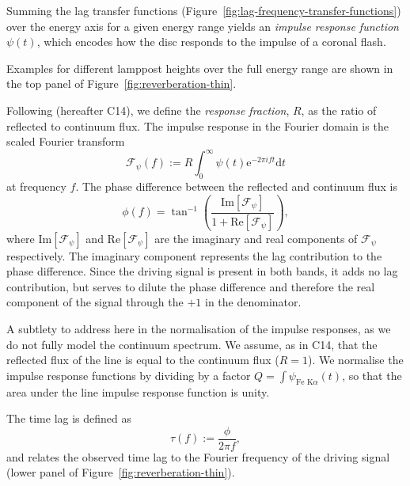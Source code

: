 \documentclass[fleqn,usenatbib]{mnras}
\newcommand{\e}{\text{e}}
\renewcommand{\d}{\text{d}}
\renewcommand{\Im}[1]{\text{Im}\left[#1\right]}
\renewcommand{\Re}[1]{\text{Re}\left[#1\right]}
\begin{document}
Summing the lag transfer functions
(Figure~\ref{fig:lag-frequency-transfer-functions}) over the energy axis for a
given energy range yields an \textit{impulse response function} $\psi(t)$, which
encodes how the disc responds to the impulse of a coronal flash.

Examples for different lamppost heights over the full energy range are shown in
the top panel of Figure~\ref{fig:reverberation-thin}.

Following \citet{cackett_modelling_2014} (hereafter C14), we define the
\textit{response fraction}, $R$, as the ratio of reflected to continuum flux.
The impulse response in the Fourier domain is the scaled Fourier transform
\begin{equation}
    \mathscr{F}_\psi(f) := R \int_{0}^\infty \psi(t) \e^{-2\pi i f t} \d t
\end{equation}
at frequency $f$.
The phase difference between the reflected and continuum flux is
\begin{equation}
    \phi(f) = \tan^{-1} \left(
        \frac{\Im{\mathscr{F}_\psi}}{1 + \Re{\mathscr{F}_\psi}}
    \right),
\end{equation}
where $\Im{\mathscr{F}_\psi}$ and $\Re{\mathscr{F}_\psi}$ are the imaginary and
real components of $\mathscr{F}_\psi$ respectively. The imaginary component
represents the lag contribution to the phase difference. Since the driving
signal is present in both bands, it adds no lag contribution, but serves to
dilute the phase difference and therefore the real component of the signal
through the $+1$ in the denominator.

A subtlety to address here in the normalisation of the impulse responses, as we
do not fully model the continuum spectrum. We assume, as in
C14, that the reflected flux of the line is equal to
the continuum flux ($R = 1$). We normalise the impulse response functions by
dividing by a factor $Q = \int \psi_{\text{Fe K}\alpha}(t)$, so that the area
under the line impulse response function is unity.

The time lag is defined as
\begin{equation}
    \tau(f) := \frac{\phi}{2 \pi f},
\end{equation}
and relates the observed time lag to the Fourier frequency of the driving
signal (lower panel of Figure~\ref{fig:reverberation-thin}).
\end{document}
